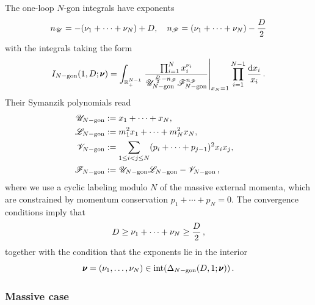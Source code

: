 \documentclass[12pt,a4paper]{article}
\theoremstyle{plain}
\theoremstyle{remark}
\newcommand{\nprops}{N}
\newcommand{\dd}{\mathrm{d}}
\newcommand{\cU}{\mathscr {U}}
\newcommand{\cF}{\mathscr {F}}
\newcommand{\cV}{\mathscr {V}}
\newcommand{\cL}{\mathscr {L}}
\newcommand{\undernotation}[1]{\pmb{#1}}
\begin{document}
The one-loop $\nprops$-gon integrals have exponents
\begin{equation} n_\cU=-(\nu_1+\cdots+\nu_\nprops)+D, \quad n_\cF=(\nu_1+\cdots+\nu_\nprops)-{D\over2}
\end{equation}
with the  integrals taking the form
\begin{equation}
  I_{\nprops-\rm gon}(1,D; \undernotation{\nu} )=
  \int_{\mathbb R_+^{\nprops-1}} \left. {\prod_{i=1}^{\nprops} x_i^{\nu_i}\over \cU_{\nprops-\rm
      gon}^{{D\over2}-n_\cF} \cF_{\nprops-\rm
      gon}^{n_\cF}}\right|_{x_\nprops=1} \prod_{i=1}^{\nprops-1} {\dd x_i\over x_i}\,.
\end{equation}
Their Symanzik polynomials  read
\begin{equation}\label{e:ULFoneloop}
        \begin{aligned}
			\cU_{\nprops-\rm gon}&:=x_1+  \cdots +x_\nprops,\cr
			\cL_{\nprops-\rm gon}&:=m_1^2x_1+\cdots +m_\nprops^2x_\nprops,\cr
			\cV_{\nprops-\rm gon}&:=\sum_{1\leq i<j\leq \nprops}
       (p_{i}+\cdots+p_{j-1})^2 x_ix_j,\cr
                                               \cF_{\nprops-\rm gon}&:=\cU_{\nprops-\rm gon}\cL_{\nprops-\rm gon}-\cV_{\nprops-\rm gon}\,,
                                               \end{aligned}
		\end{equation}
		 where we use a cyclic labeling modulo
		$\nprops$ of the massive external momenta, which are
                constrained by momentum conservation $p_1+\cdots+p_\nprops=0$.  The convergence conditions imply that
\begin{equation}\label{e:nuvsD}
  D\geq   \nu_1+\cdots+\nu_\nprops\geq {D\over2}\,,
\end{equation}
together with the condition that the exponents lie in the interior
\begin{equation}
   \undernotation{\nu}= (\nu_1,\dots,\nu_\nprops)\in\textrm{int}(	\Delta_{\nprops-\rm gon}(D,1;\undernotation{\nu}))\,.
  \end{equation}

  \subsubsection{Massive case}\label{sec:onelooppolytope}
\end{document}
